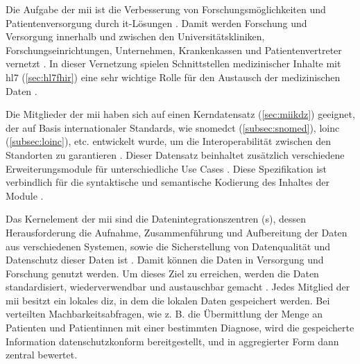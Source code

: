 Die Aufgabe der \ac{mii} ist die Verbesserung von Forschungsmöglichkeiten und Patientenversorgung durch \acs{it}-Lösungen \cite{mii}. Damit werden Forschung und Versorgung innerhalb und zwischen den Universitätskliniken, Forschungseinrichtungen, Unternehmen, Krankenkassen und Patientenvertreter vernetzt \cite{telemedizin, mii}. In dieser Vernetzung spielen Schnittstellen medizinischer Inhalte mit \acs{hl7} (\ref{sec:hl7fhir}) eine sehr wichtige Rolle für den Austausch der medizinischen Daten \cite{telemedizin}. 

Die Mitglieder der \ac{mii} haben sich auf einen Kerndatensatz (\ref{sec:miikdz}) geeignet, der auf Basis internationaler Standards, wie \ac{snomedct} (\ref{subsec:snomed}), \ac{loinc} (\ref{subsec:loinc}), etc. entwickelt wurde, um die Interoperabilität zwischen den Standorten zu garantieren \cite{telemedizin, miikdz}. Dieser Datensatz beinhaltet zusätzlich verschiedene Erweiterungsmodule für unterschiedliche Use Cases \cite{mii}. Diese Spezifikation ist verbindlich für die syntaktische und semantische Kodierung des Inhaltes der Module \cite{icukdz}.

Das Kernelement der \ac{mii} sind die Datenintegrationszentren (s), dessen Herausforderung die Aufnahme, Zusammenführung und Aufbereitung der Daten aus verschiedenen Systemen, sowie die Sicherstellung von Datenqualität und Datenschutz dieser Daten ist \cite{mii, diz}. Damit können die Daten in Versorgung und Forschung genutzt werden. Um dieses Ziel zu erreichen, werden die Daten standardisiert, wiederverwendbar und austauschbar gemacht \cite{diz}. Jedes Mitglied der \ac{mii} besitzt ein lokales \ac{diz}, in dem die lokalen Daten gespeichert werden. Bei verteilten Machbarkeitsabfragen, wie z. B. die Übermittlung der Menge an Patienten und Patientinnen mit einer bestimmten Diagnose, wird die gespeicherte Information datenschutzkonform bereitgestellt, und in aggregierter Form dann zentral bewertet.